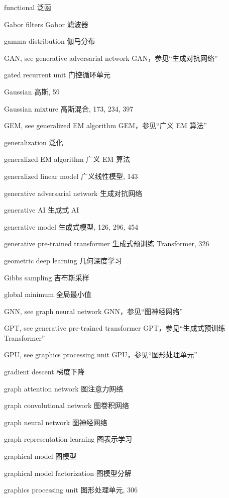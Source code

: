 functional 泛函\par
Gabor filters Gabor 滤波器\par
gamma distribution 伽马分布\par
GAN, see generative adversarial network GAN，参见“生成对抗网络”\par
gated recurrent unit 门控循环单元\par
Gaussian 高斯, 59\par
Gaussian mixture 高斯混合, 173, 234, 397\par
GEM, see generalized EM algorithm GEM，参见“广义 EM 算法”\par
generalization 泛化\par
generalized EM algorithm 广义 EM 算法\par
generalized linear model 广义线性模型, 143\par
generative adversarial network 生成对抗网络\par
generative AI 生成式 AI\par
generative model 生成式模型, 126, 296, 454\par
generative pre-trained transformer 生成式预训练 Transformer, 326\par
geometric deep learning 几何深度学习\par
Gibbs sampling 吉布斯采样\par
global minimum 全局最小值\par
GNN, see graph neural network GNN，参见“图神经网络”\par
GPT, see generative pre-trained transformer GPT，参见“生成式预训练 Transformer”\par
GPU, see graphics processing unit GPU，参见“图形处理单元”\par
gradient descent 梯度下降\par
graph attention network 图注意力网络\par
graph convolutional network 图卷积网络\par
graph neural network 图神经网络\par
graph representation learning 图表示学习\par
graphical model 图模型\par
graphical model factorization 图模型分解\par
graphics processing unit 图形处理单元, 306\par
